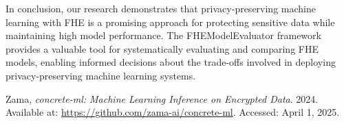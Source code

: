 \documentclass[a4paper,12pt]{article}
\begin{document}
In conclusion, our research demonstrates that privacy-preserving machine learning with FHE is a promising approach for protecting sensitive data while maintaining high model performance. The FHEModelEvaluator framework provides a valuable tool for systematically evaluating and comparing FHE models, enabling informed decisions about the trade-offs involved in deploying privacy-preserving machine learning systems.


\begin{thebibliography}

    Zama, \emph{concrete-ml: Machine Learning Inference on Encrypted Data}. 2024. Available at: \url{https://github.com/zama-ai/concrete-ml}. Accessed: April 1, 2025.
    
    \end{thebibliography}
    
\end{document}
